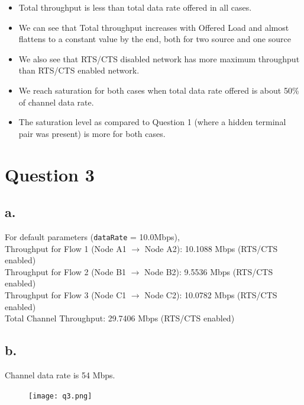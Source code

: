 \documentclass[11pt, fleqn]{article}
\begin{document}
\begin{itemize}
    \item Total throughput is less than total data rate offered in all cases.
    \item We can see that Total throughput increases with Offered Load and almost flattens to a constant value by the end, both for two source and one source
    \item We also see that RTS/CTS disabled network has more maximum throughput than RTS/CTS enabled network.
    \item We reach saturation for both cases when total data rate offered is about 50\% of channel data rate.
    \item The saturation level as compared to Question 1 (where a hidden terminal pair was present) is more for both cases.
\end{itemize}

\newpage 
\section*{Question 3}
\setcounter{equation}{0}

\subsection*{a.}

For default parameters (\texttt{dataRate} = 10.0Mbps),\\

Throughput for Flow 1 (Node A1 $\rightarrow$ Node A2): 10.1088 Mbps (RTS/CTS enabled) \\
Throughput for Flow 2 (Node B1 $\rightarrow$ Node B2): 9.5536 Mbps (RTS/CTS enabled) \\
Throughput for Flow 3 (Node C1 $\rightarrow$ Node C2): 10.0782 Mbps (RTS/CTS enabled) \\

Total Channel Throughput: 29.7406 Mbps (RTS/CTS enabled) \\

\subsection*{b.}

Channel data rate is 54 Mbps.

\begin{figure}[H]
    \centering
    \texttt{[image: q3.png]}
\end{figure}
\end{document}
